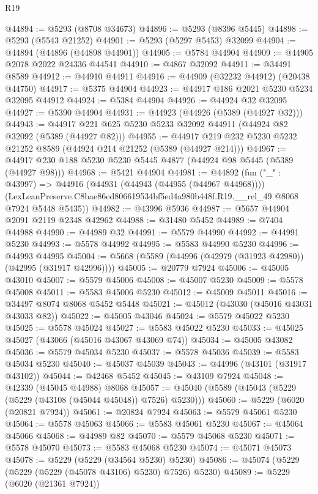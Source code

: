 \begin{lexlean}{R19}
\begin{coremodule}
@44894 := @5293 (@8708 @34673)
@44896 := @5293 (@8396 @5445)
@44898 := @5293 (@5543 @21252)
@44901 := @5293 (@5297 @5453) @32099
@44904 := @44894 (@44896 (@44898 @44901))
@44905 := @5784 @44904
@44909 := @44905 @2078 @2022 @24336 @44541
@44910 := @4867 @32092
@44911 := @34491 @8589
@44912 := @44910 @44911
@44916 := @44909 (@32232 @44912) (@20438 @44750)
@44917 := @5375 @44904
@44923 := @44917 @186 @2021 @5230 @5234 @32095 @44912
@44924 := @5384 @44904
@44926 := @44924 @32 @32095
@44927 := @5390 @44904
@44931 := @44923 (@44926 (@5389 (@44927 @32)))
@44943 := @44917 @221 @625 @5230 @5233 @32092 @44911 (@44924 @82 @32092 (@5389 (@44927 @82)))
@44955 := @44917 @219 @232 @5230 @5232 @21252 @8589 (@44924 @214 @21252 (@5389 (@44927 @214)))
@44967 := @44917 @230 @188 @5230 @5230 @5445 @4877 (@44924 @98 @5445 (@5389 (@44927 @98)))
@44968 := @5421 @44904
@44981 := @44892
    (fun ("_" : @43997) =>
    @44916
      (@44931 (@44943 (@44955 (@44967 @44968))))
      (LexLeanPreserve.C8bae86ed806619534bf5ed4a980b448f.R19.__rel_49 @8068 @7924 @5448 @5435))
@44982 := @43996 @5936
@44987 := @5657 @44904 @2091 @2119 @2348 @42962
@44988 := @31480 @5452
@44989 := @7404 @44988
@44990 := @44989 @32
@44991 := @5579 @44990
@44992 := @44991 @5230
@44993 := @5578 @44992
@44995 := @5583 @44990 @5230
@44996 := @44993 @44995
@45004 := @5668 (@5589 (@44996 (@42979 (@31923 @42980)) (@42995 (@31917 @42996))))
@45005 := @20779 @7924
@45006 := @45005 @43010
@45007 := @5579 @45006
@45008 := @45007 @5230
@45009 := @5578 @45008
@45011 := @5583 @45006 @5230
@45012 := @45009 @45011
@45016 := @34497 @8074 @8068 @5452 @5448
@45021 := @45012 (@43030 (@45016 @43031 @43033 @82))
@45022 := @45005 @43046
@45024 := @5579 @45022 @5230
@45025 := @5578 @45024
@45027 := @5583 @45022 @5230
@45033 := @45025 @45027 (@43066 (@45016 @43067 @43069 @74))
@45034 := @45005 @43082
@45036 := @5579 @45034 @5230
@45037 := @5578 @45036
@45039 := @5583 @45034 @5230
@45040 := @45037 @45039
@45043 := @44996 (@43101 (@31917 @43102))
@45044 := @42468 @5452
@45045 := @43109 @7924
@45048 := @42339 (@45045 @44988) @8068
@45057 := @45040 (@5589 (@45043 (@5229 (@5229 (@43108 (@45044 @45048)) @7526) @5230)))
@45060 := @5229 (@6020 (@20821 @7924))
@45061 := @20824 @7924
@45063 := @5579 @45061 @5230
@45064 := @5578 @45063
@45066 := @5583 @45061 @5230
@45067 := @45064 @45066
@45068 := @44989 @82
@45070 := @5579 @45068 @5230
@45071 := @5578 @45070
@45073 := @5583 @45068 @5230
@45074 := @45071 @45073
@45078 := @5229 (@5229 (@34564 @5230) @5230)
@45086 := @45074 (@5229 (@5229 (@5229 (@45078 @43106) @5230) @7526) @5230)
@45089 := @5229 (@6020 (@21361 @7924))

\end{coremodule}
\end{lexlean}
